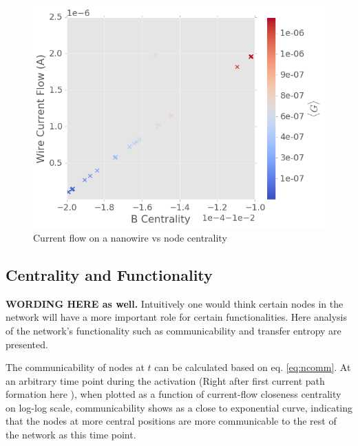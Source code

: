 \documentclass[%
 reprint,
 amsmath,amssymb,
 aps,
]{revtex4-2}
\begin{document}
\begin{figure}[h]
	\centering
	\includegraphics[width=1\linewidth]{figure/I_cent}
	\caption{Current flow on a nanowire vs node centrality}
	\label{fig:i_cent}
\end{figure}

\subsection{\label{sec:level2} Centrality and Functionality}

\textbf{WORDING HERE as well.} Intuitively one would think certain nodes in the network will have a more important role for certain functionalities. Here analysis of the network's functionality such as communicability and transfer entropy are presented.

The communicability of nodes at $t$ can be calculated based on eq. \ref{eq:ncomm}. At an arbitrary time point during the activation (Right after first current path formation here ), when plotted as a function of current-flow closeness centrality on log-log scale, communicability shows as a close to exponential curve, indicating that the nodes at more central positions are more communicable to the rest of the network as this time point. 


\end{document}
